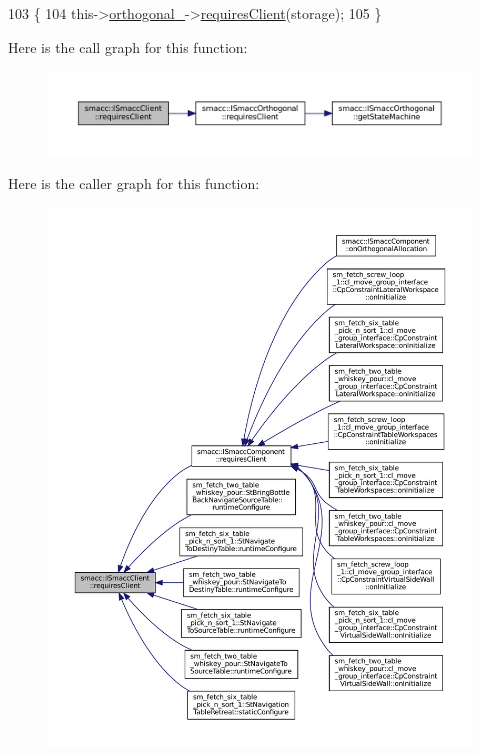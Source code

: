 \begin{DoxyCode}
103     \{
104         this->\hyperlink{classsmacc_1_1ISmaccClient_a571c7f672d9c90128b5498aefc27c136}{orthogonal\_}->\hyperlink{classsmacc_1_1ISmaccOrthogonal_a602e16b09f8a1b3de889f2f3d90a3211}{requiresClient}(storage);
105     \}
\end{DoxyCode}
Here is the call graph for this function\+:
\nopagebreak
\begin{figure}[H]
\begin{center}
\leavevmode
\includegraphics[width=350pt]{classsmacc_1_1ISmaccClient_a7a9990a2f3e35d547671188d69fee520_cgraph}
\end{center}
\end{figure}
Here is the caller graph for this function\+:
\nopagebreak
\begin{figure}[H]
\begin{center}
\leavevmode
\includegraphics[width=350pt]{classsmacc_1_1ISmaccClient_a7a9990a2f3e35d547671188d69fee520_icgraph}
\end{center}
\end{figure}
\mbox{\label{classsmacc_1_1ISmaccClient_a40330788a976dc08e2f726d210564ec4}} 
